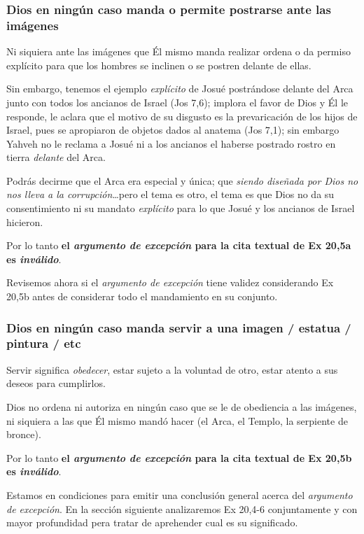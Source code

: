 \documentclass{article}
\begin{document}
\subsubsection{Dios en ning\'un caso manda o permite postrarse ante las im\'agenes}

Ni siquiera ante las im\'agenes que \'El mismo manda realizar ordena o da permiso expl\'{i}cito para que los hombres se inclinen o se postren delante de ellas.

Sin embargo, tenemos el ejemplo \emph{expl\'{i}cito} de Josu\'e postr\'andose delante del Arca junto con todos los ancianos de Israel (Jos 7,6); implora el favor de Dios y \'El le responde, le aclara que el motivo de su disgusto es la prevaricaci\'on de los hijos de Israel, pues se apropiaron de objetos dados al anatema (Jos 7,1); sin embargo Yahveh no le reclama a Josu\'e ni a los ancianos el haberse postrado rostro en tierra \emph{delante} del Arca.

Podr\'as decirme que el Arca era especial y \'unica; que \emph{siendo dise\~nada por Dios no nos lleva a la corrupci\'on}\ldots pero el tema es otro, el tema es que Dios no da su consentimiento ni su mandato \emph{expl\'{i}cito} para lo que Josu\'e y los ancianos de Israel hicieron.

Por lo tanto \textbf{el \emph{argumento de excepci\'on} para la cita textual de Ex 20,5a es \emph{inv\'alido}}.

Revisemos ahora si el \emph{argumento de excepci\'on} tiene validez considerando Ex 20,5b antes de considerar todo el mandamiento en su conjunto.

\subsubsection{Dios en ning\'un caso manda servir a una imagen / estatua / pintura / etc}

Servir significa \emph{obedecer}, estar sujeto a la voluntad de otro, estar atento a sus deseos para cumplirlos.

Dios no ordena ni autoriza en ning\'un caso que se le de obediencia a las im\'agenes, ni siquiera a las que \'El mismo mand\'o hacer (el Arca, el Templo, la serpiente de bronce).

Por lo tanto \textbf{el \emph{argumento de excepci\'on} para la cita textual de Ex 20,5b es \emph{inv\'alido}}.

Estamos en condiciones para emitir una conclusi\'on general acerca del \emph{argumento de excepci\'on}. En la secci\'on siguiente analizaremos Ex 20,4-6 conjuntamente y con mayor profundidad pera tratar de aprehender cual es su significado.
\end{document}
